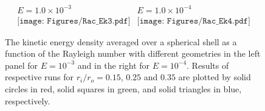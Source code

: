\begin{figure}
\begin{center}
\[
\begin{array}{cc}
\mbox{$E = 1.0 \times 10^{-3}$} & \mbox{$E = 1.0 \times 10^{-4}$} \\
\texttt{[image: Figures/Rac\_Ek3.pdf]} &
\texttt{[image: Figures/Rac\_Ek4.pdf]}
\end{array}
\]
\end{center}
\caption{{\color{red}
The kinetic energy density averaged over a spherical shell as a function of the Rayleigh number with different geometries in the left panel for $E = 10^{-3}$ and in the right for $E = 10^{-4}$. 
Results of respective runs for $r_i/r_o = 0.15$, $0.25$ and $0.35$ are plotted by solid circles in red, solid squares in green, and solid triangles in blue, respectively. 
}
}
\label{fig:fig_1}
\end{figure}